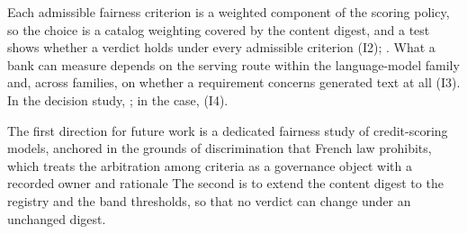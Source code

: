 Each admissible fairness criterion is a weighted component of the scoring policy, so the choice is a catalog weighting covered by the content digest, and a test shows whether a verdict holds under every admissible criterion (I2); .
What a bank can measure depends on the serving route within the language-model family and, across families, on whether a requirement concerns generated text at all (I3).
In the decision study, ; in the \aicc{} case,  (I4).
\fi

The first direction for future work is a dedicated fairness study of credit-scoring models, anchored in the grounds of discrimination that French law prohibits, which treats the arbitration among criteria as a governance object with a recorded owner and rationale
The second is to extend the content digest to the registry and the band thresholds, so that no verdict can change under an unchanged digest.
